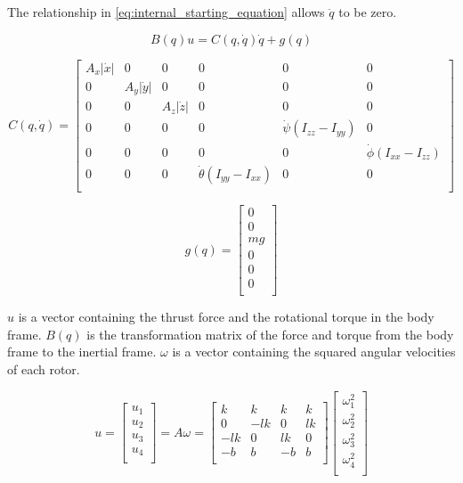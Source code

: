 \documentclass[letterpaper,12pt,titlepage,oneside,final]{book}
\begin{document}
The relationship in \eqref{eq:internal_starting_equation} allows $\ddot{q}$ to be zero.

\begin{equation} \label{eq:internal_starting_equation}
B(q)u = C(q,\dot{q})\dot{q} + g(q)
\end{equation}

\begin{equation} \label{eq:C}
C(q,\dot{q}) = 
\begin{bmatrix}
A_{x}|\dot{x}| & 0 & 0 & 0 & 0 & 0 \\
0 & A_{y}|\dot{y}| & 0 & 0 & 0 & 0 \\
0 & 0 & A_{z}|\dot{z}| & 0 & 0 & 0 \\
0 & 0 & 0 & 0 & \dot{\psi}(I_{zz} - I_{yy}) & 0 \\
0 & 0 & 0 & 0 & 0 & \dot{\phi}(I_{xx} - I_{zz}) \\
0 & 0 & 0 & \dot{\theta}(I_{yy} - I_{xx}) & 0 & 0 \\
\end{bmatrix}
\end{equation}

\begin{equation} \label{eq:g}
g(q) =
\begin{bmatrix}
0 \\
0 \\
mg \\
0 \\
0 \\
0 \\
\end{bmatrix}
\end{equation}

$u$ is a vector containing the thrust force and the rotational torque in the body frame. $B(q)$ is the transformation matrix of the force and torque from the body frame to the inertial frame. $\omega$ is a vector containing the squared angular velocities of each rotor.

\begin{equation} \label{eq:u}
u =
\begin{bmatrix}
u_{1} \\
u_{2} \\
u_{3} \\
u_{4} \\
\end{bmatrix}
=
A\omega
=
\begin{bmatrix}
k & k & k & k \\
0 & -lk & 0 & lk \\
-lk & 0 & lk & 0 \\
-b & b & -b & b \\
\end{bmatrix}
\begin{bmatrix}
\omega_{1}^{2} \\
\omega_{2}^{2} \\
\omega_{3}^{2} \\
\omega_{4}^{2} \\
\end{bmatrix}
\end{equation}
\end{document}
